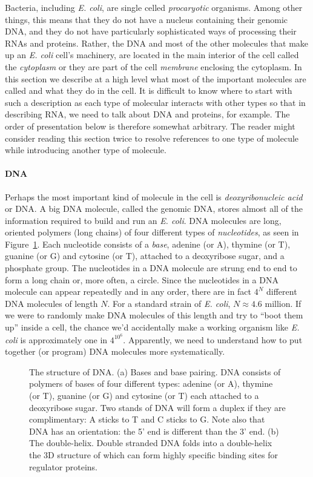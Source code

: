 Bacteria, including {\em E. coli}, are single celled {\em procaryotic}
organisms. Among other things, this means that they do not have a
nucleus containing their genomic DNA, and they do not have
particularly sophisticated ways of processing their RNAs and
proteins. Rather, the DNA and most of the other molecules that make up
an {\em E. coli} cell's machinery, are located in the main interior of
the cell called the {\em cytoplasm} or they are part of the cell {\em
  membrane} enclosing the cytoplasm. In this section we describe at a
high level what most of the important molecules are called and what
they do in the cell. It is difficult to know where to start with such
a description as each type of molecular interacts with other types so
that in describing RNA, we need to talk about DNA and proteins, for
example. The order of presentation below is therefore somewhat
arbitrary. The reader might consider reading this section twice to
resolve references to one type of molecule while introducing another
type of molecule.


\paragraph{DNA} Perhaps the most important kind of molecule in the
cell is {\em deoxyribonucleic acid} or DNA. A big DNA molecule, called
the genomic DNA, stores almost all of the information required to
build and run an {\em E. coli}. DNA molecules are long, oriented
polymers (long chains) of four different types of {\em nucleotides},
as seen in Figure~\ref{fig:dna}. Each nucleotide consists of a {\em
  base}, adenine (or A), thymine (or T), guanine (or G) and cytosine
(or T), attached to a deoxyribose sugar, and a phosphate group. The
nucleotides in a DNA molecule are strung end to end to form a long
chain or, more often, a circle. Since the nucleotides in a DNA molecule
can appear repeatedly and in any order, there are in fact $4^N$
different DNA molecules of length $N$. For a standard strain of {\em
  E. coli}, $N \approx 4.6$ million. If we were to randomly
make DNA molecules of this length and try to ``boot them up'' inside a
cell, the chance we'd accidentally make a working organism like {\em
  E. coli} is approximately one in $4^{10^6}$. Apparently, we need to
understand how to put together (or program) DNA molecules more
systematically.

\begin{figure}
\caption{\label{fig:dna}The structure of DNA. (a) Bases and base
  pairing. DNA consists of polymers of bases of four different types:
  adenine (or A), thymine (or T), guanine (or G) and cytosine (or T)
  each attached to a deoxyribose sugar. Two stands of DNA will form a
  duplex if they are complimentary: A sticks to T and C sticks to
  G. Note also that DNA has an orientation: the 5' end is different
  than the 3' end. (b) The double-helix. Double stranded DNA folds
  into a double-helix the 3D structure of which can form highly
  specific binding sites for regulator proteins.}
\end{figure}

